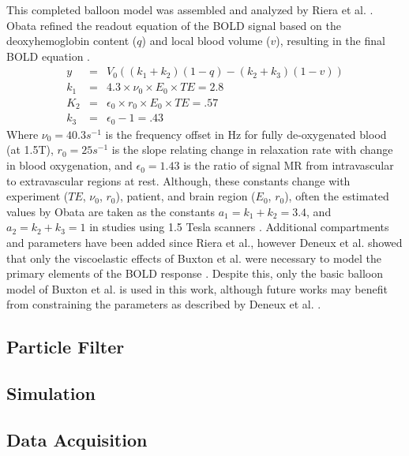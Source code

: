 \documentclass[journal]{./IEEEtran}
\begin{document}
This completed balloon model was assembled and analyzed
by Riera et al. \cite{Riera2003}. Obata refined the readout equation 
of the BOLD signal based on the deoxyhemoglobin content ($q$) and local 
blood volume ($v$), resulting in the final BOLD equation \cite{Obata2004}.
\begin{eqnarray}
y   &=& V_0((k_1 + k_2)(1-q) - (k_2 + k_3)(1-v))\\
k_1 &=& 4.3 \times \nu_0 \times E_0 \times TE = 2.8 \nonumber \\
K_2 &=& \epsilon_0 \times r_0 \times E_0 \times TE = .57 \nonumber \\
k_3 &=& \epsilon_0 - 1 = .43 \nonumber
\label{eq:boldout}
\end{eqnarray}
Where $\nu_0 = 40.3 s^{-1}$  is the frequency offset in Hz for fully
de-oxygenated blood (at 1.5T), $r_0 = 25 s^{-1}$  is the slope relating
change in relaxation rate with change in blood oxygenation, and
$\epsilon_0 = 1.43$ is the ratio of signal MR from intravascular to 
extravascular regions at rest. Although, these constants change with 
experiment ($TE$, $\nu_0$, $r_0$), patient, and brain 
region ($E_0$, $r_0$), often the estimated values by Obata are 
taken as the constants $a_1 = k_1 + k_2 = 3.4$, and $a_2 = k_2+k_3 = 1$ in 
studies using 1.5 Tesla scanners \cite{Obata2004}.
Additional compartments and parameters have been added since 
Riera et al., however Deneux et al. showed that only the viscoelastic
effects of Buxton et al. were necessary to model the primary 
elements of the BOLD response \cite{Riera2003, Deneux2006, Buxton2004}.
Despite this, only the basic balloon model of Buxton et al. is
used in this work, although future works may benefit from constraining
the parameters as described by Deneux et al. \cite{Buxton2004, Deneux2006}.

\subsection{Particle Filter}
\label{sec:ParticleFilter}
\subsection{Simulation}
\label{sec:MethodsSim}
\subsection{Data Acquisition}
\label{sec:MethodsData}
\end{document}

